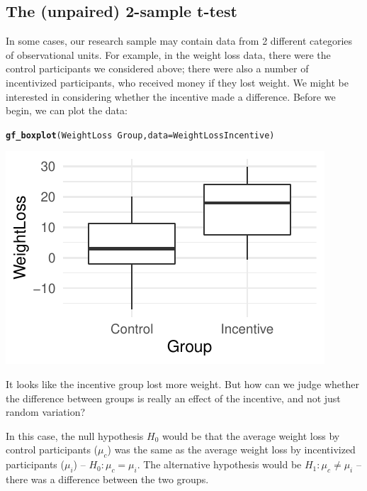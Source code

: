 \documentclass[twoside]{book}\usepackage[]{graphicx}\usepackage[]{xcolor}
\makeatletter
\def\maxwidth{ %
  \ifdim\Gin@nat@width>\linewidth
    \linewidth
  \else
    \Gin@nat@width
  \fi
}
\newcommand{\hlopt}[1]{\textcolor[rgb]{0,0,0}{#1}}%
\newcommand{\hlstd}[1]{\textcolor[rgb]{0.345,0.345,0.345}{#1}}%
\newcommand{\hlkwc}[1]{\textcolor[rgb]{0.333,0.667,0.333}{#1}}%
\newcommand{\hlkwd}[1]{\textcolor[rgb]{0.737,0.353,0.396}{\textbf{#1}}}%
\newenvironment{kframe}{%
 \def\at@end@of@kframe{}%
 \ifinner\ifhmode%
  \def\at@end@of@kframe{\end{minipage}}%
  \begin{minipage}{\columnwidth}%
 \fi\fi%
 \def\FrameCommand##1{\hskip\@totalleftmargin \hskip-\fboxsep
 \colorbox{shadecolor}{##1}\hskip-\fboxsep
     \hskip-\linewidth \hskip-\@totalleftmargin \hskip\columnwidth}%
 \MakeFramed {\advance\hsize-\width
   \@totalleftmargin\z@ \linewidth\hsize
   \@setminipage}}%
 {\par\unskip\endMakeFramed%
 \at@end@of@kframe}
\newenvironment{knitrout}{}{} %
\newcounter{example}[section]
\makeatother
\begin{document}
\subsection{The (unpaired) 2-sample t-test}
In some cases, our research sample may contain data from 2 different categories of observational units.  For example, in the weight loss data, there were the control participants we considered above; there were also a number of incentivized participants, who received money if they lost weight.  We might be interested in considering whether the incentive made a difference.  Before we begin, we can plot the data:

\begin{knitrout}
\color{fgcolor}\begin{kframe}
\begin{alltt}
\hlkwd{gf_boxplot}\hlstd{(WeightLoss} \hlopt{~} \hlstd{Group,} \hlkwc{data} \hlstd{= WeightLossIncentive)}
\end{alltt}


{\ttfamily\noindent\color{warningcolor}{\#\# Warning: Removed 2 rows containing non-finite values (stat\_boxplot).}}\end{kframe}

{\centering \includegraphics[width=\maxwidth]{figures/fig-unnamed-chunk-307-1} 

}



\end{knitrout}

It looks like the incentive group lost more weight.  But how can we judge whether the difference between groups is really an effect of the incentive, and not just random variation?

In this case, the null hypothesis $H_0$ would be that the average weight loss by control participants ($\mu_c$) was the same as the average weight loss by incentivized participants ($\mu_i$) -- $H_0: \mu_c = \mu_i$.  The alternative hypothesis would be $H_1: \mu_c \neq \mu_i$ -- there was a difference between the two groups.
\end{document}
